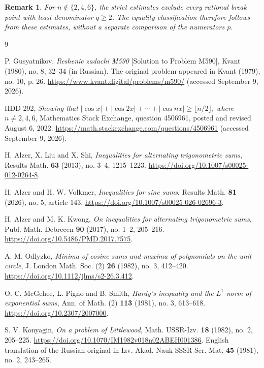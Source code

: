 \documentclass[11pt]{article}
\newtheorem{remark}{Remark}
\begin{document}
\begin{remark}
For \(n\notin\{2,4,6\}\), the strict estimates exclude every rational
break point with least denominator \(q\ge2\). The equality
classification therefore follows from these estimates, without a
separate comparison of the numerators \(p\).
\end{remark}

\begingroup
\small
\raggedright
\begin{thebibliography}{9}

P. Gusyatnikov,
\emph{Reshenie zadachi M590} [Solution to Problem M590],
Kvant (1980), no. 8, 32--34 (in Russian).
The original problem appeared in Kvant (1979), no. 10, p. 26.
\url{https://www.kvant.digital/problems/m590/}
(accessed September 9, 2026).

HDD 292,
\emph{Showing that \(|\cos x|+|\cos 2x|+\cdots+|\cos nx|
\ge\lfloor n/2\rfloor\), where \(n\neq2,4,6\)},
Mathematics Stack Exchange, question 4506961,
posted and revised August 6, 2022.
\url{https://math.stackexchange.com/questions/4506961}
(accessed September 9, 2026).

H. Alzer, X. Liu and X. Shi,
\emph{Inequalities for alternating trigonometric sums},
Results Math. \textbf{63} (2013), no. 3--4, 1215--1223.
\url{https://doi.org/10.1007/s00025-012-0264-8}.

H. Alzer and H. W. Volkmer,
\emph{Inequalities for sine sums},
Results Math. \textbf{81} (2026), no. 5, article 143.
\url{https://doi.org/10.1007/s00025-026-02696-3}.

H. Alzer and M. K. Kwong,
\emph{On inequalities for alternating trigonometric sums},
Publ. Math. Debrecen \textbf{90} (2017), no. 1--2, 205--216.
\url{https://doi.org/10.5486/PMD.2017.7575}.

A. M. Odlyzko,
\emph{Minima of cosine sums and maxima of polynomials on the unit circle},
J. London Math. Soc. (2) \textbf{26} (1982), no. 3, 412--420.
\url{https://doi.org/10.1112/jlms/s2-26.3.412}.

O. C. McGehee, L. Pigno and B. Smith,
\emph{Hardy's inequality and the \(L^1\)-norm of exponential sums},
Ann. of Math. (2) \textbf{113} (1981), no. 3, 613--618.
\url{https://doi.org/10.2307/2007000}.

S. V. Konyagin,
\emph{On a problem of Littlewood},
Math. USSR-Izv. \textbf{18} (1982), no. 2, 205--225.
\url{https://doi.org/10.1070/IM1982v018n02ABEH001386}.
English translation of the Russian original in
Izv. Akad. Nauk SSSR Ser. Mat. \textbf{45} (1981), no. 2, 243--265.

\end{thebibliography}
\endgroup
\end{document}
